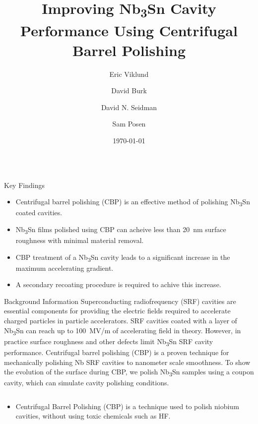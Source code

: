\documentclass{beamer}
\title{Improving Nb\textsubscript{3}Sn Cavity Performance Using Centrifugal Barrel Polishing}%
\author{Eric Viklund \inst{1, 2} \and David Burk \inst{2} \and David N. Seidman \inst{1} \and Sam Posen \inst{2}}
\institute[shortinst]{\inst{1}Department of Materials Science and Engineering, Northwestern University\\
\inst{2}Fermi National Accelerator Laboratory}
\date{\today}%
\begin{document}
%
    \begin{frame}{}
        \begin{columns}[t]
            \begin{column}{0.32\linewidth}
                \begin{alertblock}{\label{sec:introduction}Key Findings}
                    \begin{itemize}
                        \item Centrifugal barrel polishing (CBP) is an effective method of polishing Nb\textsubscript{3}Sn coated cavities.
                        \item Nb\textsubscript{3}Sn films polished using CBP can acheive less than 20~nm surface roughness with minimal material removal.
                        \item CBP treatment of a Nb\textsubscript{3}Sn cavity leads to a significant increase in the maximum accelerating gradient.
                        \item A secondary recoating procedure is required to achive this increase.
                    \end{itemize}
                \end{alertblock}
                \begin{block}{\label{sec:backgroundinformation}Background Information}
                    Superconducting radiofrequency (SRF) cavities are essential components for providing the electric fields required to accelerate charged particles in particle accelerators. SRF cavities coated with a layer of Nb\textsubscript{3}Sn can reach up to 100~MV/m of accelerating field in theory. However, in practice surface roughness and other defects limit Nb\textsubscript{3}Sn SRF cavity performance. Centrifugal barrel polishing (CBP) is a proven technique for mechanically polishing Nb SRF cavities to nanometer scale smoothness. To show the evolution of the surface during CBP, we polish Nb\textsubscript{3}Sn samples using a coupon cavity, which can simulate cavity polishing conditions.
                    \begin{columns}[t]
                        \begin{column}{0.45\columnwidth}
                            \begin{itemize}
                                \item Centrifugal Barrel Polishing (CBP) is a technique used to polish niobium cavities, without using toxic chemicals such as HF.

\end{itemize}
\end{column}
\end{columns}
\end{block}
\end{column}
\end{columns}
\end{frame}
\end{document}
